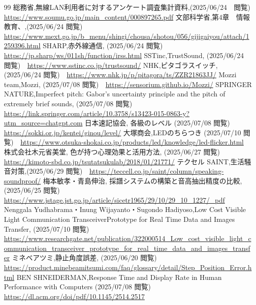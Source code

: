 \begin{thebibliography}{99}
 総務省,無線LAN利用者に対するアンケート調査集計資料,(2025/06/24　閲覧) \url{https://www.soumu.go.jp/main_content/000897265.pdf}
 文部科学省,第4章　情報教育、,(2025/06/24 閲覧) \url{https://www.mext.go.jp/b_menu/shingi/chousa/shotou/056/gijigaiyou/attach/1259396.html}
SHARP,赤外線通信, (2025/06/24 閲覧)　\url{https://jp.sharp/ws/011sh/function/irss.html}
SSTinc,TrustSound, (2025/06/24 閲覧)　\url{https://www.sstinc.co.jp/trustsound/}
NHK,ピタゴラスイッチ, (2025/06/24 閲覧)　\url{https://www.nhk.jp/p/pitagora/ts/ZZR21863JJ/}
Mozzi team,Mozzi, (2025/07/08 閲覧)　\url{https://sensorium.github.io/Mozzi/}
SPRINGER NATURE,Imperfect pitch: Gabor’s uncertainty principle and the pitch of extremely brief sounds, (2025/07/08 閲覧)　\url{https://link.springer.com/article/10.3758/s13423-015-0863-y?utm_source=chatgpt.com}
日本速記協会, 各級のレベル (2025/07/08 閲覧)　\url{https://sokki.or.jp/kentei/ginou/level/}
大塚商会,LEDのちらつき (2025/07/10 閲覧)　\url{https://www.otsuka-shokai.co.jp/products/led/knowledge/led-flicker.html}
株式会社木元省美堂, 色が持つ心理効果と活用方法, (2025/06/27 閲覧)　\url{https://kimoto-sbd.co.jp/tsutatsukulab/2018/01/21771/}
テクセル SAINT,生活騒音対策,(2025/06/29 閲覧)　\url{https://teccell.co.jp/saint/column/speaking-soundproof/}
梅本敏孝・青島伸治, 採譜システムの構築と音高抽出精度の比較, (2025/06/25 閲覧)　\url{https://www.jstage.jst.go.jp/article/sicetr1965/29/10/29_10_1227/_pdf}
 Nenggala Yudhabrama・Inung Wijayanto・Sugondo Hadiyoso,Low Cost Visible Light Communication TransceiverPrototype for Real Time Data and Images Transfer, (2025/07/10 閲覧)　\url{https://www.researchgate.net/publication/322000514_Low_cost_visible_light_communication_transceiver_prototype_for_real_time_data_and_images_transfer}
ミネベアツミ,静止角度誤差, (2025/06/20 閲覧)　\url{https://product.minebeamitsumi.com/faq/glossary/detail/Step_Position_Error.html}
BEN SHNEIDERMAN,Response Time and Display Rate in Human Performance with Computers (2025/07/08 閲覧)　\url{https://dl.acm.org/doi/pdf/10.1145/2514.2517}

\end{thebibliography}